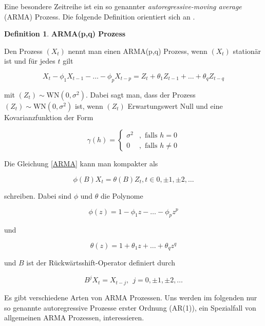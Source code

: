 \documentclass[12pt,a4paper]{article}
\theoremstyle{definition}
\newtheorem{Definition}{Definition}[subsection]
\theoremstyle{definition}
\theoremstyle{definition}
\theoremstyle{definition}
\begin{document}
Eine besondere Zeitreihe ist ein so genannter \textit{autoregressive-moving average} (ARMA) Prozess. Die folgende Definition orientiert sich an \cite[78]{Brockwell91}.

\begin{Definition}
\textbf{ARMA(p,q) Prozess}

Den Prozess $(X_t)$ nennt man einen ARMA(p,q) Prozess, wenn $(X_t)$ stationär ist und für jedes $t$ gilt

\begin{equation}\label{ARMA}
X_t - \phi_1 X_{t-1} - \ldots - \phi_p X_{t-p} = Z_t + \theta_1 Z_{t-1} + \ldots + \theta_q Z_{t-q}
\end{equation}

mit $(Z_t) \sim \text{WN}(0, \sigma^2)$.  Dabei sagt man, dass der Prozess $(Z_t) \sim \text{WN}(0, \sigma^2)$ ist, wenn $(Z_t)$ Erwartungswert Null und eine Kovarianzfunktion der Form

\begin{equation*}
\gamma(h) = \begin{cases} \sigma^2 &, \text{ falls } h=0 \\ 0 &, \text{ falls } h \neq 0 \end{cases}
\end{equation*}
\end{Definition}

Die Gleichung \eqref{ARMA} kann man kompakter als

\begin{equation*}
\phi(B) X_t = \theta(B) Z_t, t \in 0, \pm 1, \pm 2, \ldots
\end{equation*}

schreiben. Dabei sind $\phi$ und $\theta$ die Polynome

\begin{equation*}
\phi(z) = 1 - \phi_1 z - \ldots - \phi_p z^p
\end{equation*}

und 

\begin{equation*}
\theta(z) = 1 + \theta_1 z + \ldots + \theta_q z^q
\end{equation*}

und $B$ ist der Rückwärtsshift-Operator definiert durch

\begin{equation*}
B^j X_t = X_{t-j},~~ j = 0, \pm 1, \pm 2, \ldots
\end{equation*}

Es gibt verschiedene Arten von ARMA Prozessen. Uns werden im folgenden nur so genannte autoregressive Prozesse erster Ordnung (AR(1)), ein Spezialfall von allgemeinen ARMA Prozessen, interessieren.
\end{document}
